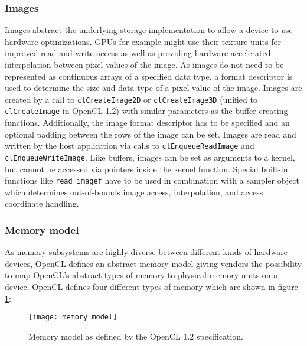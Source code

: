 \subsubsection{Images}
\label{sec:images}
Images abstract the underlying storage implementation to allow a device to use hardware optimizations. GPUs for example might use their texture units for improved read and write access as well as providing hardware accelerated interpolation between pixel values of the image. As images do not need to be represented as continuous arrays of a specified data type, a format descriptor is used to determine the size and data type of a pixel value of the image. Images are created by a call to \lstinline!clCreateImage2D! or \lstinline!clCreateImage3D! (unified to \lstinline!clCreateImage! in OpenCL 1.2) with similar parameters as the buffer creating functions. Additionally, the image format descriptor has to be specified and an optional padding between the rows of the image can be set. Images are read and written by the host application via calls to \lstinline!clEnqueueReadImage! and \lstinline!clEnqueueWriteImage!. Like buffers, images can be set as arguments to a kernel, but cannot be accessed via pointers inside the kernel function. Special built-in functions like \lstinline!read_imagef! have to be used in combination with a sampler object which determines out-of-bounds image access, interpolation, and access coordinate handling. \cite[p.25f]{opencl_book}

\subsubsection{Memory model}
As memory subsystems are highly diverse between different kinds of hardware devices, OpenCL defines an abstract memory model giving vendors the possibility to map OpenCL's abstract types of memory to physical memory units on a device.
OpenCL defines four different types of memory which are shown in figure \ref{fig:memory_model}:

\begin{figure} 
\centering
\texttt{[image: memory\_model]}
\caption{Memory model as defined by the OpenCL 1.2 specification.\cite{opencl_spec}}
\label{fig:memory_model}
\end{figure}

